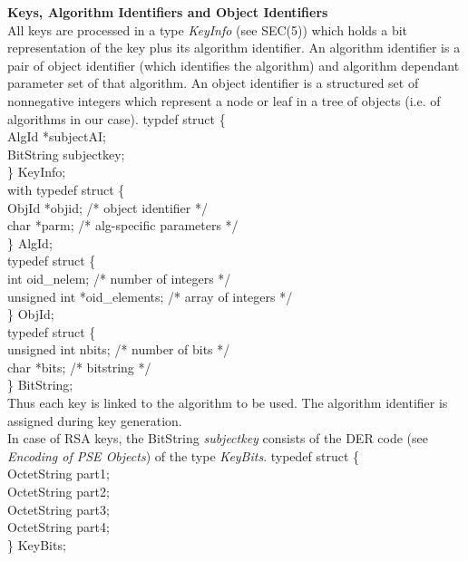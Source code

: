 {\bf Keys, Algorithm Identifiers and Object Identifiers}
\\ [1em]
All keys are processed in a type {\em KeyInfo} (see SEC(5)) which holds a 
bit representation of the 
key plus its algorithm identifier. An algorithm identifier
is a pair of object identifier (which identifies the algorithm) and 
algorithm dependant parameter set of that
algorithm. An object identifier is a structured set of nonnegative integers 
which represent a node or leaf
in a tree of objects (i.e. of algorithms in our case).
{\small
\bvtab
\4 typdef struct \{ \\
\6	AlgId     \2 *subjectAI; \\
\6      BitString \2 subjectkey; \\
\4 \} KeyInfo; \\
\evtab
}
with
{\small
\bvtab
\4 typedef struct \{ \\
\6      ObjId  \2  *objid; \3 /* object identifier */ \\
\6      char   \2  *parm;  \3 /* alg-specific parameters */ \\
\4 \} AlgId; \\
\evtab
}
{\small
\bvtab
\4 typedef struct \{ \\
\6      int           \3  oid\_nelem;     \3 /* number of integers */ \\
\6      unsigned int  \3  *oid\_elements; \3 /* array of integers  */ \\
\4 \} ObjId; \\
\evtab
}
{\small
\bvtab
\4 typedef struct \{ \\
\6      unsigned int \3   nbits;  \3 /* number of bits */ \\
\6      char         \3  *bits;   \3 /* bitstring */ \\
\4 \} BitString; \\
\evtab
}
Thus each key is linked to the algorithm to be used. The algorithm 
identifier is assigned
during key generation. 
\\ [1em]
In case of RSA keys, the BitString {\em subjectkey} consists of the DER 
code (see {\em Encoding of PSE Objects}) of the type {\em KeyBits}.
{\small
\btab
\2      typedef struct \{ \\
\3	        OctetString \2 part1; \\
\3      	OctetString \2 part2; \\
\3      	OctetString \2 part3; \\
\3      	OctetString \2 part4; \\
\2      \} KeyBits; \\
\etab
}
